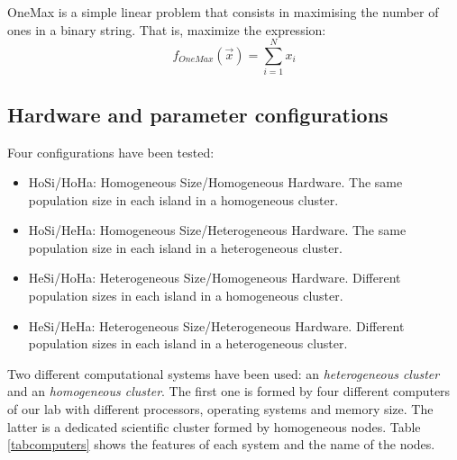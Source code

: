 \documentclass[final,1p,times]{elsarticle}
\begin{document}
OneMax is a simple linear problem that consists in maximising the number of ones in a binary string. That is, maximize the expression:
\begin{equation}
f_{OneMax}(\vec{x}) = \sum_{i=1}^{N}{x_{i}}
\end{equation}

\subsection{Hardware and parameter configurations}

Four configurations have been tested:

\begin{itemize}
\item HoSi/HoHa: Homogeneous Size/Homogeneous Hardware. The same population size in each island in a homogeneous cluster.
\item HoSi/HeHa: Homogeneous Size/Heterogeneous Hardware. The same population size in each island in a heterogeneous cluster.
\item HeSi/HoHa: Heterogeneous Size/Homogeneous Hardware. Different population sizes in each island in a homogeneous cluster.
\item HeSi/HeHa: Heterogeneous Size/Heterogeneous Hardware. Different population sizes in each island in a heterogeneous cluster.
\end{itemize}

Two different computational systems have been used: an {\em heterogeneous cluster} and an {\em homogeneous cluster}. The first one is formed by four different computers of our lab with different processors, operating systems and memory size. The latter is a dedicated scientific cluster formed by homogeneous nodes. Table \ref{tabcomputers} shows the features of each system and the name of the nodes.
\end{document}
